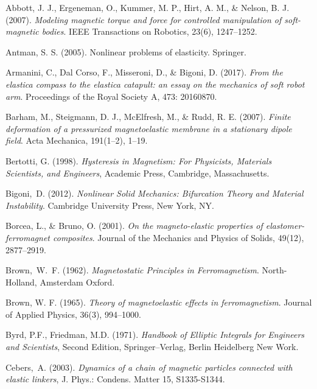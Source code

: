 \documentclass[oneside]{article}
\begin{document}
			\begin{thebibliography}{9}
				
				 Abbott, J. J., Ergeneman, O., Kummer, M. P., Hirt, A. M., \& Nelson, B. J. (2007). \textit{Modeling magnetic torque and force for controlled manipulation of soft-magnetic bodies}. IEEE Transactions on Robotics, 23(6), 1247--1252. 
				
				 Antman, S. S. (2005). Nonlinear problems of elasticity. Springer.
				
				 Armanini, C., Dal Corso, F., Misseroni, D., \& Bigoni, D. (2017). \textit{From the elastica compass to the elastica catapult: an essay on the mechanics of soft robot arm}. Proceedings of the Royal Society A, 473: 20160870.
				
				 Barham, M., Steigmann, D. J., McElfresh, M., \& Rudd, R. E. (2007). \textit{Finite deformation of a pressurized magnetoelastic membrane in a stationary dipole field}. Acta Mechanica, 191(1--2), 1--19. 
				
				 Bertotti, G. (1998). \textit{Hysteresis in Magnetism: For Physicists, Materials Scientists, and Engineers}, Academic Press, Cambridge, Massachusetts.
				
				 Bigoni,~D. (2012). \textit{Nonlinear Solid Mechanics: Bifurcation Theory and Material Instability}. Cambridge University Press, New York, NY.
				
				
				 Borcea, L., \& Bruno, O. (2001). \textit{On the magneto-elastic properties of elastomer-ferromagnet composites}. Journal of the Mechanics and Physics of Solids, 49(12), 2877--2919. 
				
				 Brown,~W.~F. (1962). \textit{Magnetostatic Principles in Ferromagnetism}. North-Holland, Amsterdam Oxford.
				
				 Brown, W. F. (1965). \textit{Theory of magnetoelastic effects in ferromagnetism}. Journal of Applied Physics, 36(3), 994--1000. 
				
				 Byrd, P.F.,  Friedman, M.D. (1971). \textit{Handbook of Elliptic Integrals for Engineers and Scientists}, Second Edition, Springer--Verlag, Berlin Heidelberg New Work.
				
				 Cebers,~A. (2003). \textit{Dynamics of a chain of magnetic particles connected with elastic linkers}, J. Phys.: Condens. Matter 15, S1335-S1344. 
				

\end{thebibliography}
\end{document}
